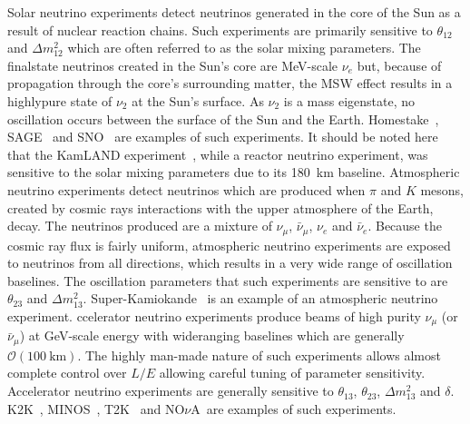 \newline
\newline
Solar neutrino experiments detect neutrinos generated in the core of the Sun as a result of nuclear  reaction chains.  Such experiments are primarily sensitive to $\theta_{12}$ and $\Delta m^{2}_{12}$ which are often referred to as the solar mixing parameters.  The finalstate neutrinos created in the Sun's core are MeV-scale $\nu_e$ but, because of propagation through the core's surrounding matter, the MSW effect results in a highlypure state of $\nu_2$ at the Sun's surface.  As $\nu_2$ is a mass eigenstate, no oscillation occurs between the surface of the Sun and the Earth.  Homestake~\cite{0004-637X-496-1-505}, SAGE~\cite{PhysRevC.80.015807} and SNO~\cite{PhysRevLett.87.071301} are examples of such experiments.  It should be noted here that the KamLAND experiment~\cite{PhysRevLett.90.021802}, while a reactor neutrino experiment, was sensitive to the solar mixing parameters due to its 180~km baseline.
\newline
\newline
Atmospheric neutrino experiments detect neutrinos which are produced when $\pi$ and $K$ mesons, created by cosmic rays interactions with the upper atmosphere of the Earth, decay.  The neutrinos produced are a mixture of $\nu_\mu$, $\bar{\nu}_\mu$, $\nu_e$ and $\bar{\nu}_e$.  Because the cosmic ray flux is fairly uniform, atmospheric neutrino experiments are exposed to neutrinos from all directions, which results in a very wide range of oscillation baselines.  The oscillation parameters that such experiments are sensitive to are $\theta_{23}$ and $\Delta m^2_{13}$. Super-Kamiokande~\cite{PhysRevLett.81.1562} is an example of an atmospheric neutrino experiment. 
\newline
\newline
{}ccelerator neutrino experiments produce beams of high purity $\nu_\mu$ (or $\bar{\nu}_\mu$) at GeV-scale energy with wideranging baselines which are generally $\mathcal{O}\left(100~\textrm{km}\right)$.  The highly man-made nature of such experiments allows almost complete control over $L/E$ allowing careful tuning of parameter sensitivity.  Accelerator neutrino experiments are generally sensitive to $\theta_{13}$, $\theta_{23}$, $\Delta m^{2}_{13}$ and $\delta$. K2K~\cite{PhysRevD.74.072003}, MINOS~\cite{PhysRevLett.97.191801}, T2K~\cite{PhysRevLett.112.061802} and NO$\nu$A~\cite{Ayres:2004js}are examples of such experiments.

